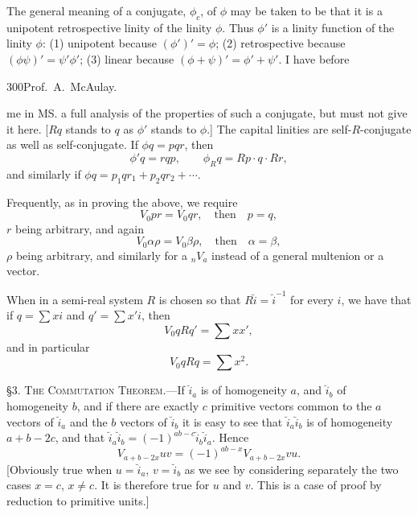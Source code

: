 \documentclass[11pt]{article}
\begin{document}
The general meaning of a conjugate, $\phi_c$, of $\phi$ may be taken to be that it is a unipotent retrospective linity of the linity $\phi$. Thus $\phi'$ is a linity function of the linity $\phi$: (1) unipotent because $(\phi')'=\phi$; (2) retrospective because $(\phi\psi)'=\psi'\phi'$; (3) linear because $(\phi+\psi)'=\phi'+\psi'$. I have before

\newpage\thispagestyle{empty}\begin{center}300\hfill Prof.\ A.\ McAulay.\end{center}
me in MS. a full analysis of the properties of such a conjugate, but must not give it here. [$R q$ stands to $q$ as $\phi'$ stands to $\phi$.] The capital linities are self-$R$-conjugate as well as self-conjugate. If $\phi q=pqr$, then
\begin{equation}\phi'q=rqp,\qquad \phi_Rq=Rp\cdot q\cdot Rr,\tag{15}\end{equation}
and similarly if $\phi q=p_1qr_1+p_2qr_2+\cdots$.

\indent Frequently, as in proving the above, we require
\begin{equation}V_0pr=V_0qr,\quad\text{then}\quad p=q,\tag{16}\end{equation}
$r$ being arbitrary, and again
\begin{equation}V_0\alpha\rho=V_0\beta\rho,\quad\text{then}\quad\alpha=\beta,\tag{17}\end{equation}
$\rho$ being arbitrary, and similarly for a ${}_nV_a$ instead of a general multenion or a vector.

\indent When in a semi-real system $R$ is chosen so that $R\breve{i}=\breve{i}^{-1}$ for every $i$, we have that if $q=\sum xi$ and $q'=\sum x'i$, then
\[V_0qRq'=\sum xx',\]
and in particular
\[V_0qRq=\sum x^2.\]

\noindent\textsc{\S 3. The Commutation Theorem.}---If $\breve{i}_a$ is of homogeneity $a$, and $\breve{i}_b$ of homogeneity $b$, and if there are exactly $c$ primitive vectors common to the $a$ vectors of $\breve{i}_a$ and the $b$ vectors of $\breve{i}_b$ it is easy to see that $\breve{i}_a\breve{i}_b$ is of homogeneity $a+b-2c$, and that $\breve{i}_a\breve{i}_b=(-1)^{ab-c}\breve{i}_b\breve{i}_a$. Hence
\begin{equation}V_{a+b-2x}uv=(-1)^{ab-x}V_{a+b-2x}vu.\tag{1}\end{equation}
[Obviously true when $u=\breve{i}_a$, $v=\breve{i}_b$ as we see by considering separately the two cases $x=c$, $x\ne c$. It is therefore true for $u$ and $v$. This is a case of proof by reduction to primitive units.]
\end{document}
